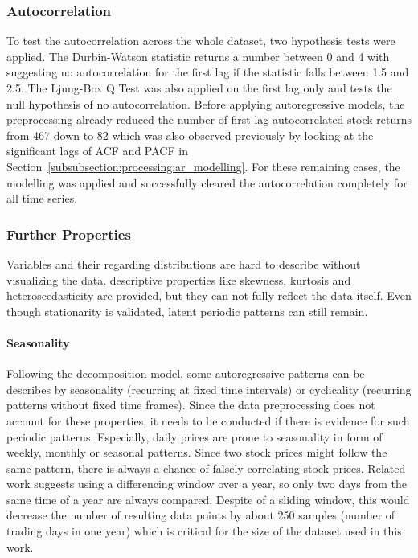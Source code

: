 \subsubsection{Autocorrelation}
\label{subsubsection:autocorrelation}

To test the autocorrelation across the whole dataset, two hypothesis tests were applied. The Durbin-Watson statistic \cite{Durbin1971TestingRegression.III} returns a number between 0 and 4 with suggesting no autocorrelation for the first lag if the statistic falls between 1.5 and 2.5. The Ljung-Box Q Test \cite{Dionisio2004MutualSeries} was also applied on the first lag only and tests the null hypothesis of no autocorrelation. Before applying autoregressive models, the preprocessing already reduced the number of first-lag autocorrelated stock returns from 467 down to 82 which was also observed previously by looking at the significant lags of ACF and PACF in Section~\ref{subsubsection:processing:ar_modelling}. For these remaining cases, the modelling was applied and successfully cleared the autocorrelation completely for all time series.

\subsubsection{Further Properties}

Variables and their regarding distributions are hard to describe without visualizing the data. descriptive properties like skewness, kurtosis and heteroscedasticity are provided, but they can not fully reflect the data itself. Even though stationarity is validated, latent periodic patterns can still remain.

\paragraph{Seasonality} 
Following the decomposition model, some autoregressive patterns can be describes by seasonality (recurring at fixed time intervals) or cyclicality (recurring patterns without fixed time frames). Since the data preprocessing does not account for these properties, it needs to be conducted if there is evidence for such periodic patterns. Especially, daily prices are prone to seasonality in form of weekly, monthly or seasonal patterns. Since two stock prices might follow the same pattern, there is always a chance of falsely correlating stock prices. Related work suggests using a differencing window over a year, so only two days from the same time of a year are always compared. Despite of a sliding window, this would decrease the number of resulting data points by about 250 samples (number of trading days in one year) which is critical for the size of the dataset used in this work.

